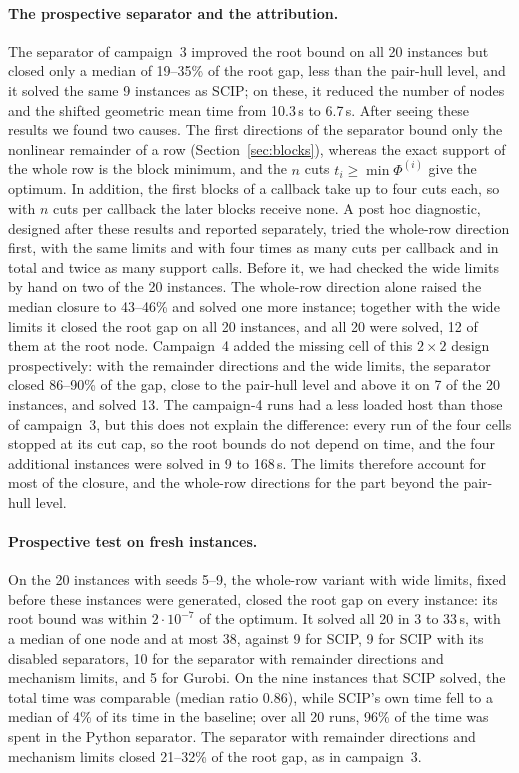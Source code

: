 \paragraph{The prospective separator and the attribution.} The separator of
campaign~3 improved the root bound on all 20 instances but closed only a median
of 19--35\% of the root gap, less than the pair-hull level, and it solved the
same 9 instances as SCIP; on these, it reduced the number of nodes and the
shifted geometric mean time from 10.3\,s to 6.7\,s. After seeing these results
we found two causes. The first directions of the separator bound only the
nonlinear remainder of a row (Section~\ref{sec:blocks}), whereas the exact
support of the whole row is the block minimum, and the $n$ cuts
$t_i\ge\min\Phi^{(i)}$ give the optimum. In addition, the first blocks of a
callback take up to four cuts each, so with $n$ cuts per callback the later
blocks receive none. A post hoc diagnostic, designed after these results and
reported separately, tried the whole-row direction first, with the same limits
and with four times as many cuts per callback and in total and twice as many
support calls. Before it, we had
checked the wide limits by hand on two of the 20 instances. The whole-row
direction alone raised the median closure to 43--46\% and solved one more
instance; together with the wide
limits it closed the root gap on all 20 instances, and all 20 were solved, 12
of them at the root node. Campaign~4 added the missing cell of this $2\times2$
design prospectively: with the remainder directions and the wide limits, the
separator closed 86--90\% of the gap, close to the pair-hull level and above
it on 7 of the 20 instances, and solved 13. The campaign-4 runs had a less loaded
host than those of campaign~3, but this does not explain the difference: every
run of the four cells stopped at its cut cap, so the root bounds do not depend
on time, and the four additional instances were solved in 9 to 168\,s. The
limits therefore account for most of the closure, and the whole-row
directions for the part beyond the pair-hull level.

\paragraph{Prospective test on fresh instances.} On the 20 instances with
seeds 5--9, the whole-row variant with wide limits, fixed before these
instances were generated, closed the root gap on every instance: its root
bound was within $2\cdot10^{-7}$ of the optimum. It solved all 20 in 3 to 33\,s,
with a median of one node and at most 38, against 9 for SCIP, 9
for SCIP with its disabled separators, 10 for the separator with remainder directions and mechanism limits, and 5 for
Gurobi. On the nine instances that SCIP solved, the total time was comparable
(median ratio 0.86), while SCIP's own time fell to a median of 4\% of its time
in the baseline; over all 20 runs, 96\% of the time was spent in the Python
separator. The separator with remainder directions and mechanism limits
closed 21--32\% of the root gap, as in campaign~3.


